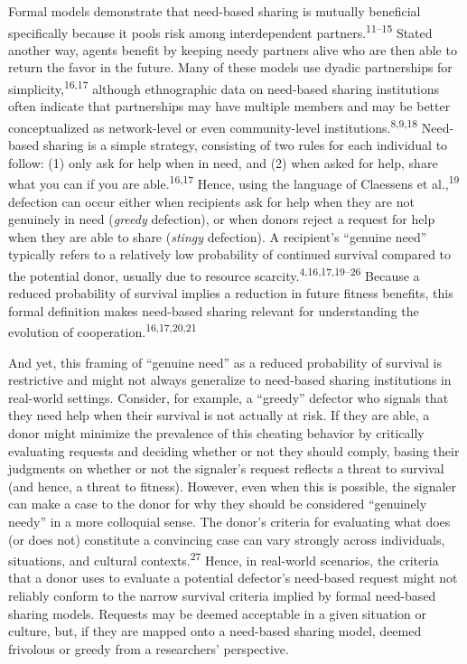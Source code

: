 \documentclass[
]{article}
\begin{document}
Formal models demonstrate that need-based sharing is mutually beneficial specifically because it pools risk among interdependent partners.\textsuperscript{11--15} Stated another way, agents benefit by keeping needy partners alive who are then able to return the favor in the future. Many of these models use dyadic partnerships for simplicity,\textsuperscript{16,17} although ethnographic data on need-based sharing institutions often indicate that partnerships may have multiple members and may be better conceptualized as network-level or even community-level institutions.\textsuperscript{8,9,18} Need-based sharing is a simple strategy, consisting of two rules for each individual to follow: (1) only ask for help when in need, and (2) when asked for help, share what you can if you are able.\textsuperscript{16,17} Hence, using the language of Claessens et al.,\textsuperscript{19} defection can occur either when recipients ask for help when they are not genuinely in need (\emph{greedy} defection), or when donors reject a request for help when they are able to share (\emph{stingy} defection). A recipient's ``genuine need'' typically refers to a relatively low probability of continued survival compared to the potential donor, usually due to resource scarcity.\textsuperscript{4,16,17,19--26} Because a reduced probability of survival implies a reduction in future fitness benefits, this formal definition makes need-based sharing relevant for understanding the evolution of cooperation.\textsuperscript{16,17,20,21}

And yet, this framing of ``genuine need'' as a reduced probability of survival is restrictive and might not always generalize to need-based sharing institutions in real-world settings. Consider, for example, a ``greedy'' defector who signals that they need help when their survival is not actually at risk. If they are able, a donor might minimize the prevalence of this cheating behavior by critically evaluating requests and deciding whether or not they should comply, basing their judgments on whether or not the signaler's request reflects a threat to survival (and hence, a threat to fitness). However, even when this is possible, the signaler can make a case to the donor for why they should be considered ``genuinely needy'' in a more colloquial sense. The donor's criteria for evaluating what does (or does not) constitute a convincing case can vary strongly across individuals, situations, and cultural contexts.\textsuperscript{27} Hence, in real-world scenarios, the criteria that a donor uses to evaluate a potential defector's need-based request might not reliably conform to the narrow survival criteria implied by formal need-based sharing models. Requests may be deemed acceptable in a given situation or culture, but, if they are mapped onto a need-based sharing model, deemed frivolous or greedy from a researchers' perspective.
\end{document}
